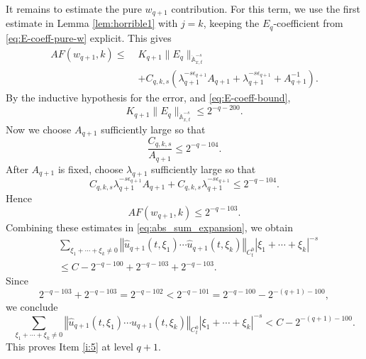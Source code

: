 \documentclass[12pt,reqno,letterpaper]{amsart}
\numberwithin{equation}{section}
\newcommand{\1}{{\bf 1}}
\newcommand{\2}{{\bf 2}}
\newcommand{\ep}{\varepsilon}
\theoremstyle{remark}
\newtheorem{remark}[theorem]{Remark}
\theoremstyle{remark}
\begin{document}
It remains to estimate the pure $w_{q+1}$ contribution. For this term, we use the first estimate in Lemma \ref{lem:horrible1} with $j=k$, keeping the $E_q$-coefficient from \eqref{eq:E-coeff-pure-w} explicit. This gives
\[
\begin{aligned}
AF(w_{q+1},k)
\le\;&
K_{q+1}\|E_q\|_{\dot{\mathbb{A}}_{x,t}^{-s}}
\\
&+
C_{q,k,s}
\left(
    \lambda_{q+1}^{-s\epsilon_{q+1}}A_{q+1}
    +
    \lambda_{q+1}^{-s\epsilon_{q+1}}
    +
    A_{q+1}^{-1}
\right).
\end{aligned}
\]
By the inductive hypothesis for the error, and \eqref{eq:E-coeff-bound},
\[
    K_{q+1}\|E_q\|_{\dot{\mathbb{A}}_{x,t}^{-s}}
    \le 2^{-q-200}.
\]
Now we choose $A_{q+1}$ sufficiently large so that
\begin{equation}\label{eq:A_q+1_cond2}
    \frac{C_{q,k,s}}{A_{q+1}}
    \leq 2^{-q-104}.
\end{equation}
After $A_{q+1}$ is fixed, choose $\lambda_{q+1}$ sufficiently large so that
\begin{equation}\label{eq:pure-prod-small}
    C_{q,k,s}\lambda_{q+1}^{-s\epsilon_{q+1}}A_{q+1}
    +
    C_{q,k,s}\lambda_{q+1}^{-s\epsilon_{q+1}}
    \leq
    2^{-q-104}.
\end{equation}
Hence
\[
    AF(w_{q+1},k)
    \leq
    2^{-q-103}.
\]
Combining these estimates in \eqref{eq:abs_sum_expansion}, we obtain
\[
\begin{aligned}
&\sum_{\xi_1+\cdots+\xi_k\neq0}
\left\Vert
\hat{u}_{q+1}(t,\xi_1)\cdots \hat{u}_{q+1}(t,\xi_k)
\right\Vert_{C_t^0}
|\xi_1+\cdots+\xi_k|^{-s}
\\
&\leq
C-2^{-q-100}
+
2^{-q-103}
+
2^{-q-103}.
\end{aligned}
\]
Since
\[
    2^{-q-103}+2^{-q-103}
    =
    2^{-q-102}
    <
    2^{-q-101}
    =
    2^{-q-100}-2^{-(q+1)-100},
\]
we conclude
\[
\sum_{\xi_1+\cdots+\xi_k\neq0}
\left\Vert
\hat{u}_{q+1}(t,\xi_1)\cdots \hat{u}_{q+1}(t,\xi_k)
\right\Vert_{C_t^0}
|\xi_1+\cdots+\xi_k|^{-s}
<
C-2^{-(q+1)-100}.
\]
This proves Item \ref{i:5} at level $q+1$.
\end{document}

